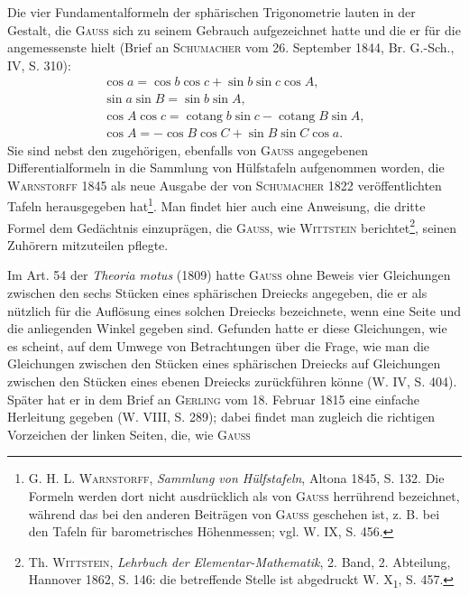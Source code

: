 \par
Die vier Fundamentalformeln der sphärischen Trigonometrie lauten in
der Gestalt, die \textsc{Gauss} sich zu seinem Gebrauch aufgezeichnet hatte und die
er für die angemessenste hielt (Brief an \textsc{Schumacher} vom 26. September 1844,
Br. G.-Sch., IV, S. 310):
\[
\begin{gathered}
\cos a=\cos b\cos c+\sin b\sin c\cos A,\\
\sin a\sin B=\sin b\sin A,\\
\cos A\cos c=\operatorname{cotang}b\sin c-\operatorname{cotang}B\sin A,\\
\cos A=-\cos B\cos C+\sin B\sin C\cos a.
\end{gathered}
\]
\noindent Sie sind nebst den zugehörigen, ebenfalls von \textsc{Gauss} angegebenen Differentialformeln
in die Sammlung von Hülfstafeln aufgenommen worden, die \textsc{Warnstorff}
1845 als neue Ausgabe der von \textsc{Schumacher} 1822 veröffentlichten
Tafeln herausgegeben hat\footnote{G. H. L. \textsc{Warnstorff}, \textit{Sammlung von Hülfstafeln}, Altona 1845, S. 132. Die Formeln werden dort nicht ausdrücklich als von \textsc{Gauss} herrührend bezeichnet, während das bei den anderen Beiträgen von \textsc{Gauss} geschehen ist, z. B. bei den Tafeln für barometrisches Höhenmessen; vgl. W. IX, S. 456.}. Man findet hier auch eine Anweisung, die dritte
Formel dem Gedächtnis einzuprägen, die \textsc{Gauss}, wie \textsc{Wittstein} berichtet\footnote{Th. \textsc{Wittstein}, \textit{Lehrbuch der Elementar-Mathematik}, 2. Band, 2. Abteilung, Hannover 1862, S. 146: die betreffende Stelle ist abgedruckt W. X\textsubscript{1}, S. 457.},
seinen Zuhörern mitzuteilen pflegte.
\par
Im Art. 54 der \textit{Theoria motus} (1809) hatte \textsc{Gauss} ohne Beweis vier Gleichungen
zwischen den sechs Stücken eines sphärischen Dreiecks angegeben,
die er als nützlich für die Auflösung eines solchen Dreiecks bezeichnete, wenn
eine Seite und die anliegenden Winkel gegeben sind. Gefunden hatte er
diese Gleichungen, wie es scheint, auf dem Umwege von Betrachtungen über
die Frage, wie man die Gleichungen zwischen den Stücken eines sphärischen
Dreiecks auf Gleichungen zwischen den Stücken eines ebenen Dreiecks
\clearpage{}\setcounter{footnote}{0}
\noindent zurückführen könne (W. IV, S. 404). Später hat er in dem Brief an \textsc{Gerling} vom
18. Februar 1815 eine einfache Herleitung gegeben (W. VIII, S. 289); dabei
findet man zugleich die richtigen Vorzeichen der linken Seiten, die, wie \textsc{Gauss}
